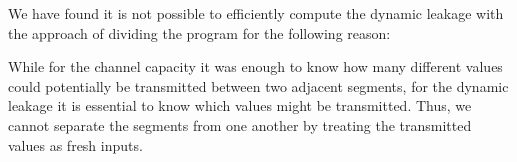 We have found it is not possible to efficiently compute the dynamic leakage with the approach of dividing the program for the following reason:

While for the channel capacity it was enough to know how many different values could potentially be transmitted between two adjacent segments, for the dynamic leakage it is essential to know which values might be transmitted. Thus, we cannot separate the segments from one another by treating the transmitted values as fresh inputs.
